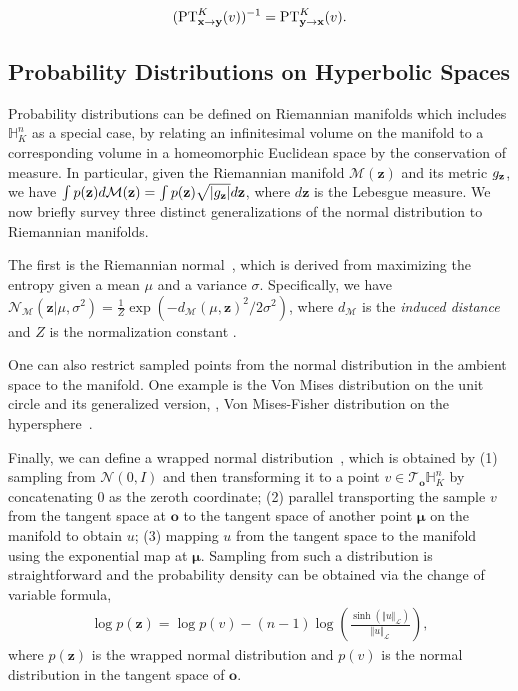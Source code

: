 \begin{equation}
       \label{eqn:inv_parallel_transport}
      (\textnormal{PT}^{K}_{\textbf{x} \to \textbf{y}}(v))^{-1} = \textnormal{PT}^K_{\textbf{y} \to \textbf{x}}(v).
\end{equation}

\subsection{Probability Distributions on Hyperbolic Spaces}

Probability distributions can be defined on Riemannian manifolds which includes $\mathbb{H}^n_K$ as a special case, by relating an infinitesimal volume on the manifold to a corresponding volume in a homeomorphic Euclidean space by the conservation of measure.
In particular, given the Riemannian manifold $\mathcal{M}(\textbf{z})$ and its metric $g_{\mathbf{z}}$, we have $\int p(\textbf{z}) d\mathcal{M} (\textbf{z}) = \int p(\textbf{z})\sqrt{|g_{\mathbf{z}}|}d \textbf{z}$, where $d \textbf{z}$ is the Lebesgue measure. We now briefly survey three distinct generalizations of the normal distribution to Riemannian manifolds.

The first is the Riemannian normal~\cite{pennec2006intrinsic, said2014new}, which is derived from maximizing the entropy given a mean $\mu$ and a variance $\sigma$.
Specifically, we have $\mathcal{N}_{\mathcal{M}}(\textbf{z} \vert \mu, \sigma^{2}) = \frac{1}{Z} \exp \left( - d_{\mathcal{M}}(\mu, \textbf{z})^2 / 2 \sigma^{2} \right)$, where $d_{\mathcal{M}}$ is the \textit{induced distance} and $Z$ is the normalization constant \cite{said2014new, mathieu2019continuous}.

One can also restrict sampled points from the normal distribution in the ambient space to the manifold.
One example is the Von Mises distribution on the unit circle and its generalized version, \ie, Von Mises-Fisher distribution on the hypersphere~\cite{davidson2018hyperspherical}.

Finally, we can define a wrapped normal distribution~\cite{falorsi2019reparameterizing,nagano2019wrapped}, which is obtained by (1) sampling from $\mathcal{N}(0,I)$ and then transforming it to a point $v \in \mathcal{T}_\textbf{o}\mathbb{H}_K^n$ by concatenating $0$ as the zeroth coordinate; (2) parallel transporting the sample $v$ from the tangent space at $\textbf{o}$ to the tangent space of another point $\boldsymbol{\mu} $ on the manifold to obtain $u$; (3) mapping $u$ from the tangent space to the manifold using the exponential map at $\boldsymbol{\mu}$.
Sampling from such a distribution is straightforward and the probability density can be obtained via the change of variable formula,
\begin{align}
    \log p(\textbf{z}) = \log p(v) - (n-1) \log \left(\frac{\sinh{ ( \Vert u \Vert_{\mathcal{L}} ) }}{ \Vert u \Vert_{\mathcal{L}} } \right),
\end{align}
where $p(\textbf{z})$ is the wrapped normal distribution and $p(v)$ is the normal distribution in the tangent space of $\textbf{o}$.




